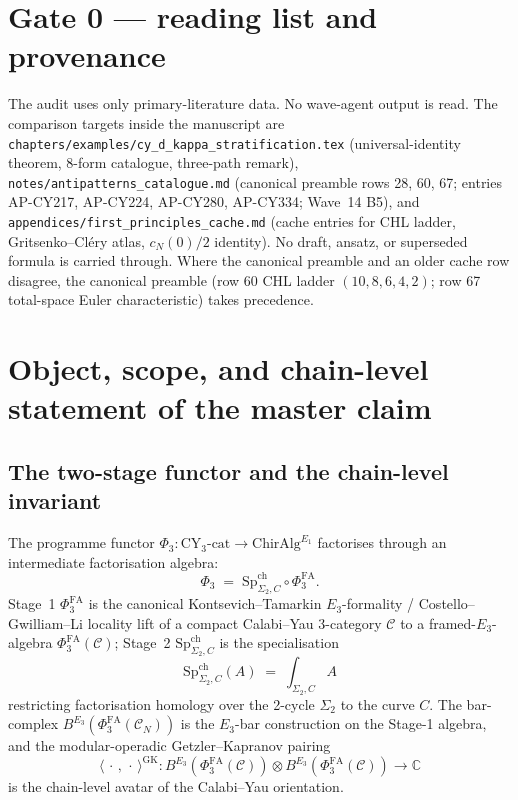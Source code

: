 \documentclass[11pt]{article}
\providecommand{\PhiFA}{\Phi^{\mathrm{FA}}}
\providecommand{\SpCh}{\mathrm{Sp}^{\mathrm{ch}}}
\theoremstyle{definition}
\begin{document}
\section*{Gate 0 --- reading list and provenance}

The audit uses only primary-literature data. No wave-agent output is
read. The comparison targets inside the manuscript are
\texttt{chapters/examples/cy\_d\_kappa\_stratification.tex}
(universal-identity theorem, 8-form catalogue, three-path remark),
\texttt{notes/antipatterns\_catalogue.md} (canonical preamble rows
28, 60, 67; entries AP-CY217, AP-CY224, AP-CY280, AP-CY334;
Wave~14 B5), and
\texttt{appendices/first\_principles\_cache.md} (cache entries for
CHL ladder, Gritsenko--Cl\'ery atlas, $c_N(0)/2$ identity).
No draft, ansatz, or superseded formula is carried through. Where the
canonical preamble and an older cache row disagree, the canonical
preamble (row 60 CHL ladder $(10,8,6,4,2)$; row 67 total-space Euler
characteristic) takes precedence.

\tableofcontents

\section{Object, scope, and chain-level statement of the master claim}
\label{sec:object-scope}

\subsection{The two-stage functor and the chain-level invariant}

The programme functor $\Phi_3 : \mathrm{CY}_3\text{-cat} \to
\mathrm{ChirAlg}^{E_1}$ factorises through an intermediate factorisation
algebra:
\[
  \Phi_3 \;=\; \SpCh_{\Sigma_2, C} \circ \PhiFA_3.
\]
Stage~1 $\PhiFA_3$ is the canonical Kontsevich--Tamarkin $E_3$-formality
/ Costello--Gwilliam--Li locality lift of a compact Calabi--Yau
3-category $\mathcal C$ to a framed-$E_3$-algebra
$\PhiFA_3(\mathcal C)$; Stage~2 $\SpCh_{\Sigma_2, C}$ is the
specialisation
\[
  \SpCh_{\Sigma_2, C}(A) \;=\; \int_{\Sigma_2, C} A
\]
restricting factorisation homology over the 2-cycle $\Sigma_2$ to the
curve $C$. The bar-complex $B^{E_3}(\PhiFA_3(\mathcal C_N))$ is the
$E_3$-bar construction on the Stage-1 algebra, and the modular-operadic
Getzler--Kapranov pairing
\[
  \langle \, \cdot \, , \, \cdot \, \rangle^{\mathrm{GK}} :
    B^{E_3}(\PhiFA_3(\mathcal C)) \otimes B^{E_3}(\PhiFA_3(\mathcal C))
    \longrightarrow \mathbb C
\]
is the chain-level avatar of the Calabi--Yau orientation.
\end{document}
